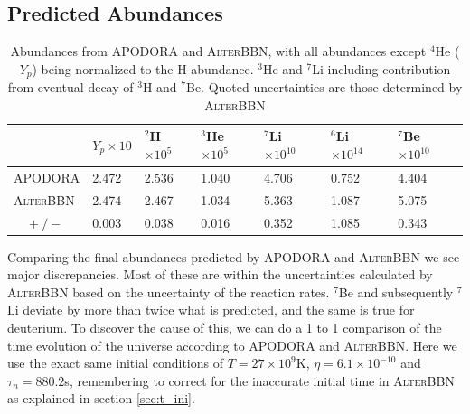 \subsection{Predicted Abundances}
\begin{table}[ht]
    \begin{tabular}{l|llllll}
        & $Y_p \times 10$ & \hspace{-0.34em}$^{2}$H$ \times 10^{5}$ & \hspace{-0.34em}$^{3}$He$ \times 10^{5}$ & \hspace{-0.34em}$^{7}$Li $ \times 10^{10}$& \hspace{-0.34em}$^{6}$Li $ \times 10^{14}$& \hspace{-0.34em}$^{7}$Be $ \times 10^{10}$\\ \hline
    APODORA & 2.472            & 2.536 & 1.040 & 4.706 & 0.752 & 4.404   \\ \hline
    \textsc{AlterBBN} & 2.474            & 2.467 & 1.034 & 5.363 & 1.087 & 5.075   \\ %
    $\quad +/-$ & 0.003           & 0.038 & 0.016 & 0.352 & 1.085 & 0.343      
    \end{tabular}
    \caption{Abundances from APODORA and \textsc{AlterBBN}, with all abundances except ${}^4$He ($Y_p$) being normalized to the H abundance. ${}^3$He and ${}^7$Li including contribution from eventual decay of ${}^3$H and ${}^7$Be. Quoted uncertainties are those determined by \textsc{AlterBBN}}
    \label{tab:shortAlterabun}
\end{table}
Comparing the final abundances predicted by APODORA and \textsc{AlterBBN} we see major discrepancies. Most of these are within the uncertainties calculated by \textsc{AlterBBN} based on the uncertainty of the reaction rates. ${}^7$Be and subsequently ${}^7$Li deviate by more than twice what is predicted, and the same is true for deuterium. To discover the cause of this, we can do a 1 to 1 comparison of the time evolution of the universe according to APODORA and \textsc{AlterBBN}. Here we use the exact same initial conditions of $T=27\times10^9$K, $\eta=6.1\times 10^{-10}$ and $\tau_n=880.2$s, remembering to correct for the inaccurate initial time in \textsc{AlterBBN} as explained in section \ref{sec:t_ini}.

